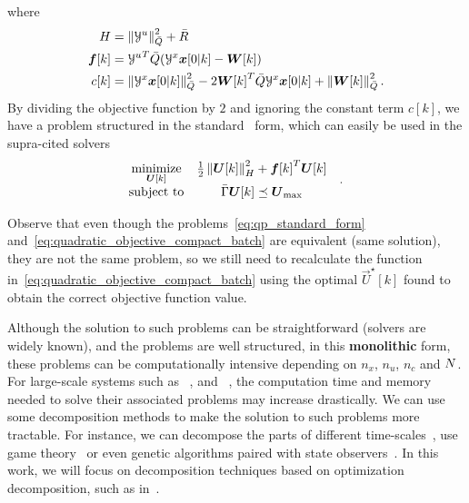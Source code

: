 \documentclass[../main.tex]{subfiles}
\begin{document}
where
\begin{align}
  \label{eq:construction_H}
H&=\left\lVert\mathcal{Y}^{u}\right\rVert^{2}_{\bar{Q}}+\bar{R}\\
\boldsymbol{f}[k]&={\mathcal{Y}^{u}}^{T}\bar{Q}(\mathcal{Y}^{x}\boldsymbol{x}[0|k]-\boldsymbol{W}[k])\\
c[k]&=\left\lVert\mathcal{Y}^{x}\boldsymbol{x}[0|k]\right\rVert^{2}_{\bar{Q}}-2{\boldsymbol{W}[k]}^{T}\bar{Q}{\mathcal{Y}^{x}}\boldsymbol{x}[0|k]+\left\lVert\boldsymbol{W}[k]\right\rVert^{2}_{\bar{Q}}.
\end{align}
By dividing the objective function by $2$ and ignoring the constant term $c[k]$, we have a problem structured in the standard \qp\ form, which can easily be used in the supra-cited solvers
\begin{equation}
  \label{eq:qp_standard_form}
  \begin{aligned}
    \begin{matrix}
      \mathop{\textrm{minimize}}\limits_{\boldsymbol{U}[k]} &
      \frac{1}{2}\left\lVert\boldsymbol{U}[k]\right\rVert^{2}_{H} + {\boldsymbol{f}[k]}^{T}\boldsymbol{U}[k] &\\
      \mathrm{subject~ to} &
\bar{\Gamma}\boldsymbol{U}[k]\preceq {\boldsymbol{U}}_{\text{max}}
    \end{matrix}
  \end{aligned}.
\end{equation}

\begin{remark}\label{rem:equivalence_problems_not_same_objective}
  Observe that even though the problems~\eqref{eq:qp_standard_form} and~\eqref{eq:quadratic_objective_compact_batch} are equivalent (same solution), they are not the same problem, so we still need to recalculate the function in~\eqref{eq:quadratic_objective_compact_batch} using the optimal $\vec{U}^{\star}[k]$ found to obtain the correct objective function value.
\end{remark}

Although the solution to such problems can be straightforward (solvers are widely known), and the problems are well structured, in this \textbf{monolithic} form, these problems can be computationally intensive depending on $n_{x}$, $n_{u}$, $n_{c}$ and $N$.
For large-scale systems such as \wdns~\cite{ZhangEtAl2021}, and \dhns~\cite{TaylorEtAl2021}, the computation time and memory needed to solve their associated problems may increase drastically.
We can use some decomposition methods to make the solution to such problems more tractable.
For instance, we can decompose the parts of different time-scales~\cite{ChenEtAl2011}, use game theory~\cite{MaestreEtAl2011} or even genetic algorithms paired with state observers~\cite{XieEtAl2016}.
In this work, we will focus on decomposition techniques based on optimization decomposition, such as in~\cite{GiselssonEtAl2013}.
\end{document}
